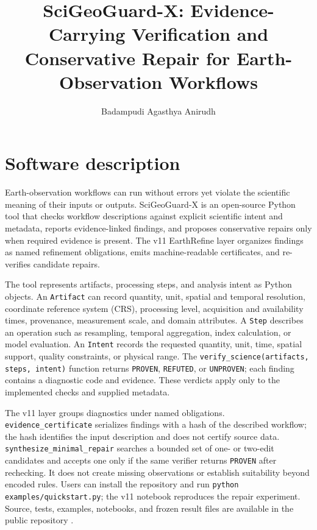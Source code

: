 \documentclass[review]{fcs}
\title{SciGeoGuard-X: Evidence-Carrying Verification and Conservative Repair for Earth-Observation Workflows}
\author*[1]{Badampudi Agasthya Anirudh}
\begin{document}
\maketitle

\section{Software description}
Earth-observation workflows can run without errors yet violate the scientific meaning of their inputs or outputs. SciGeoGuard-X is an open-source Python tool that checks workflow descriptions against explicit scientific intent and metadata, reports evidence-linked findings, and proposes conservative repairs only when required evidence is present. The v11 EarthRefine layer organizes findings as named refinement obligations, emits machine-readable certificates, and re-verifies candidate repairs.

The tool represents artifacts, processing steps, and analysis intent as Python objects. An \texttt{Artifact} can record quantity, unit, spatial and temporal resolution, coordinate reference system (CRS), processing level, acquisition and availability times, provenance, measurement scale, and domain attributes. A \texttt{Step} describes an operation such as resampling, temporal aggregation, index calculation, or model evaluation. An \texttt{Intent} records the requested quantity, unit, time, spatial support, quality constraints, or physical range. The \texttt{verify\_science(artifacts, steps, intent)} function returns \texttt{PROVEN}, \texttt{REFUTED}, or \texttt{UNPROVEN}; each finding contains a diagnostic code and evidence. These verdicts apply only to the implemented checks and supplied metadata.

The v11 layer groups diagnostics under named obligations. \texttt{evidence\_certificate} serializes findings with a hash of the described workflow; the hash identifies the input description and does not certify source data. \texttt{synthesize\_minimal\_repair} searches a bounded set of one- or two-edit candidates and accepts one only if the same verifier returns \texttt{PROVEN} after rechecking. It does not create missing observations or establish suitability beyond encoded rules. Users can install the repository and run \texttt{python examples/quickstart.py}; the v11 notebook reproduces the repair experiment. Source, tests, examples, notebooks, and frozen result files are available in the public repository \cite{sgg}.
\end{document}

